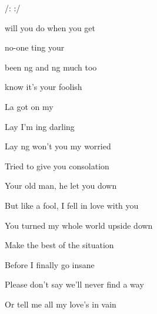 

/:     :/

\zs
{} will you do when you get 

 no-one ting  your  

 been ng and ng much too 

 know it's  your foolish  
\ks

\zr
La  got  on my 

Lay I'm ing darling 

Lay ng won't you  my worried  
\kr

\zs
Tried to give you consolation

Your old man, he let you down

But like a fool, I fell in love with you

You turned my whole world upside down
\ks

\zr \kr

\zs
Make the best of the situation

Before I finally go insane

Please don't say we'll never find a way

Or tell me all my love's in vain
\ks

\zr \kr

\kp






















